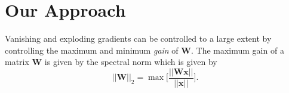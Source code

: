 \documentclass{article} %
\begin{document}
\section{Our Approach}
\label{sec:method}


Vanishing and exploding gradients can be controlled to a large extent by controlling the maximum and minimum \emph{gain} of ${\mathit{\mathbf{W}}}$.
The maximum gain of a matrix $\mathbf{W}$ is given by the spectral norm which is given by
\begin{equation}
||\mathbf{W}||_2= \max\Bigg[ \frac{||\mathbf{W}\mathbf{x}||}{||\mathbf{x}||} \Bigg].
\end{equation}
\end{document}
